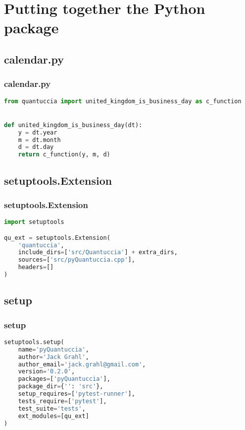 \documentclass{beamer}
\begin{document}
	\section{Putting together the Python package}

	\subsection{calendar.py}
	\begin{frame}[fragile]
		\frametitle{calendar.py}
		\begin{lstlisting}[language=Python]
from quantuccia import united_kingdom_is_business_day as c_function


def united_kingdom_is_business_day(dt):
    y = dt.year
    m = dt.month
    d = dt.day
    return c_function(y, m, d)
		\end{lstlisting}
	\end{frame}

	\subsection{setuptools.Extension}
	\begin{frame}[fragile]
		\frametitle{setuptools.Extension}
		\begin{lstlisting}[language=Python]
import setuptools

qu_ext = setuptools.Extension(
    'quantuccia',
    include_dirs=['src/Quantuccia'] + extra_dirs,   
    sources=['src/pyQuantuccia.cpp'],
    headers=[]
)
		\end{lstlisting}
	\end{frame}

	\subsection{setup}
	\begin{frame}[fragile]
		\frametitle{setup}
		\begin{lstlisting}[language=Python]
setuptools.setup(
    name='pyQuantuccia',
    author='Jack Grahl',
    author_email='jack.grahl@gmail.com',
    version='0.2.0',
    packages=['pyQuantuccia'],
    package_dir={'': 'src'},
    setup_requires=['pytest-runner'],
    tests_require=['pytest'],
    test_suite='tests',
    ext_modules=[qu_ext]
)		\end{lstlisting}
	\end{frame}
\end{document}
